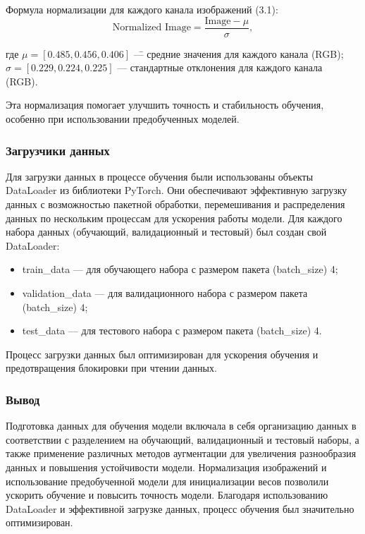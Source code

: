 {    Формула нормализации для каждого канала изображений (3.1):
    \[
    \text{Normalized Image} = \frac{\text{Image} - \mu}{\sigma}, \tag{3.1}
    \]
    \begin{tabbing}
        где 
        \=\(\mu = [0.485, 0.456, 0.406]\) \= — средние значения для каждого канала (RGB); \\
        \>\(\sigma = [0.229, 0.224, 0.225]\) \> — стандартные отклонения для каждого канала \\ (RGB).
    \end{tabbing}
    
    Эта нормализация помогает улучшить точность и стабильность обучения, особенно при использовании предобученных моделей.

    \subsubsection*{Загрузчики данных}

    Для загрузки данных в процессе обучения были использованы объекты DataLoader из библиотеки PyTorch. Они обеспечивают эффективную загрузку данных с возможностью пакетной обработки, перемешивания и распределения данных по нескольким процессам для ускорения работы модели. Для каждого набора данных (обучающий, валидационный и тестовый) был создан свой DataLoader:
    \begin{itemize}
        \item train\_data — для обучающего набора с размером пакета (batch\_size) 4;
        \item validation\_data — для валидационного набора с размером пакета \\ (batch\_size) 4;
        \item test\_data — для тестового набора с размером пакета (batch\_size) 4.
    \end{itemize}

    Процесс загрузки данных был оптимизирован для ускорения обучения и предотвращения блокировки при чтении данных.

    \subsubsection*{Вывод}

    Подготовка данных для обучения модели включала в себя организацию данных в соответствии с разделением на обучающий, валидационный и тестовый наборы, а также применение различных методов аугментации для увеличения разнообразия данных и повышения устойчивости модели. Нормализация изображений и использование предобученной модели для инициализации весов позволили ускорить обучение и повысить точность модели. Благодаря использованию DataLoader и эффективной загрузке данных, процесс обучения был значительно оптимизирован.

}
